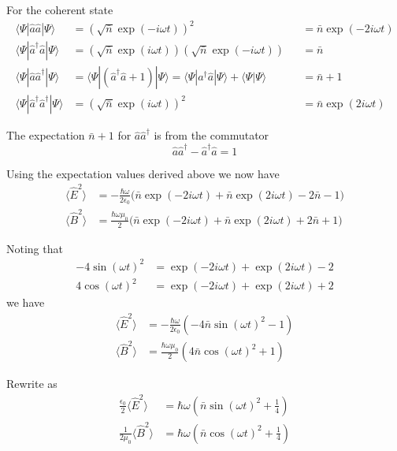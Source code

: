 \documentclass[12pt]{article}
\begin{document}
For the coherent state
\begin{align*}
\langle\Psi|\hat a\hat a|\Psi\rangle&=\left(\sqrt{\bar n}\exp(-i\omega t)\right)^2
& &=\bar n\exp(-2i\omega t)
\\
\langle\Psi|\hat a^\dag\hat a|\Psi\rangle
&=\left(\sqrt{\bar n}\exp(i\omega t)\right)\left(\sqrt{\bar n}\exp(-i\omega t)\right)
& &=\bar n
\\
\langle\Psi|\hat a\hat a^\dag|\Psi\rangle&=\langle\Psi|(\hat a^\dag\hat a+1)|\Psi\rangle
=\langle\Psi|a^\dag\hat a|\Psi\rangle+\langle\Psi|\Psi\rangle
& &=\bar n+1
\\
\langle\Psi|\hat a^\dag\hat a^\dag|\Psi\rangle&=\left(\sqrt{\bar n}\exp(i\omega t)\right)^2
& &=\bar n\exp(2i\omega t)
\end{align*}

The expectation $\bar n+1$ for $\hat a\hat a^\dag$ is from the commutator
\begin{equation*}
\hat a\hat a^\dag-\hat a^\dag\hat a=1
\end{equation*}

Using the expectation values derived above we now have
\begin{align*}
\langle\hat E^2\rangle
&=-\frac{\hbar\omega}{2\epsilon_0}
\bigl(\bar n\exp(-2i\omega t)+\bar n\exp(2i\omega t)-2\bar n-1\bigr)
\\
\langle\hat B^2\rangle
&=\frac{\hbar\omega\mu_0}{2}
\bigl(\bar n\exp(-2i\omega t)+\bar n\exp(2i\omega t)+2\bar n+1\bigr)
\end{align*}

Noting that
\begin{align*}
-4\sin(\omega t)^2&=\exp(-2i\omega t)+\exp(2i\omega t)-2\\
4\cos(\omega t)^2&=\exp(-2i\omega t)+\exp(2i\omega t)+2
\end{align*}
we have
\begin{align*}
\langle\hat E^2\rangle
&=-\frac{\hbar\omega}{2\epsilon_0}\left(-4\bar n\sin(\omega t)^2-1\right)
\\
\langle\hat B^2\rangle
&=\frac{\hbar\omega\mu_0}{2}\left(4\bar n\cos(\omega t)^2+1\right)
\end{align*}

Rewrite as
\begin{align*}
\frac{\epsilon_0}{2}\langle\hat E^2\rangle&=\hbar\omega\left(\bar n\sin(\omega t)^2+\tfrac{1}{4}\right)
\tag{1}
\\
\frac{1}{2\mu_0}\langle\hat B^2\rangle&=\hbar\omega\left(\bar n\cos(\omega t)^2+\tfrac{1}{4}\right)
\tag{2}
\end{align*}
\end{document}
